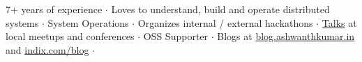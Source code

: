 

\begin{cvparagraph}
7+ years of experience ${\cdotp}$ Loves to understand, build and operate distributed systems ${\cdotp}$ System Operations ${\cdotp}$ Organizes internal / external hackathons ${\cdotp}$ \href{https://github.com/ashwanthkumar/talks}{Talks} at local meetups and conferences ${\cdotp}$ OSS Supporter ${\cdotp}$ Blogs at \href{http://blog.ashwanthkumar.in/}{blog.ashwanthkumar.in} and \href{http://www.indix.com/blog/author/ashwanth/}{indix.com/blog} ${\cdotp}$
\end{cvparagraph}
